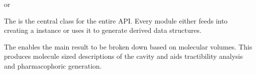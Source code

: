 \documentclass[letterpaper,10pt,english]{sphinxmanual}
\begin{document}
or

\begin{sphinxVerbatim}[commandchars=\\\{\}]
   
  
  
\end{sphinxVerbatim}

The {\hyperref[\detokenize{result_api:hotspots.result.Results}]{}} is the central class for the entire API. Every module either feeds into creating
a {\hyperref[\detokenize{result_api:hotspots.result.Results}]{}} instance or uses it to generate derived data structures.

The {\hyperref[\detokenize{result_api:hotspots.result.Extractor}]{}} enables the main result to be broken down based on molecular volumes. This
produces molecule sized descriptions of the cavity and aids tractibility analysis and pharmacophoric generation.
\end{document}
